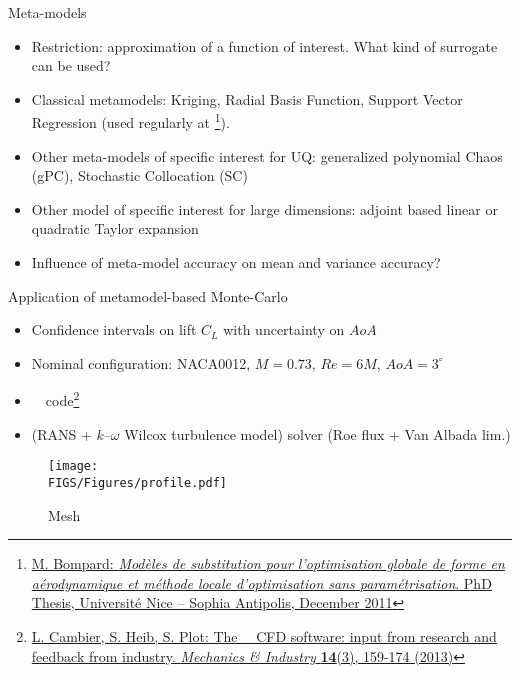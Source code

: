 \documentclass[10pt]{beamer}
\def\vt{\vspace{2mm}}
\def\vs{\vspace{7mm}}
\def\begit{\begin{itemize}}
\def\endit{\end{itemize}}
\newcommand{\lift}{C_L}
\begin{document}
\begin{frame}{Meta-models} 

\begit
\item Restriction: approximation of a function of interest. What kind of surrogate can be used?
\vs
\item[1] Classical metamodels: Kriging, Radial Basis Function, Support Vector Regression (used regularly at \Onera\footnote{\href{https://tel.archives-ouvertes.fr/tel-00771799}{{\scriptsize M. Bompard: {\sl Mod\`eles de substitution pour l'optimisation globale de forme en a\'erodynamique et m\'ethode locale d'optimisation sans param\'etrisation}. PhD Thesis, Universit\'e Nice -- Sophia Antipolis, December 2011}}}).
\vt
\item[2] Other meta-models of specific interest for UQ: generalized polynomial Chaos (gPC), Stochastic Collocation (SC)
\vt
\item[3] Other model of specific interest for large dimensions: adjoint based linear or quadratic Taylor expansion
\vs
\item Influence of meta-model accuracy on mean and variance accuracy?
\endit


\end{frame} 


\begin{frame}{Application of metamodel-based Monte-Carlo} 


\begit
\item Confidence intervals on lift $\lift$ with uncertainty on $AoA$
\item Nominal configuration: NACA0012, $M=0.73$, $Re=6M$, $AoA=3^{\circ}$
\item \Onera\ \elsA\ code\footnote{\href{\webDOI/10.1051/meca/2013056}{{\scriptsize L. Cambier, S. Heib, S. Plot: The \Onera\ \elsA\ CFD software: input from research and feedback from industry. {\sl Mechanics \& Industry} {\bf 14}(3), 159-174 (2013)}}} 
\item (RANS + $k$--$\omega$ Wilcox turbulence model) solver (Roe flux + Van Albada lim.)
\endit

\begin{figure}[!h]
\begin{center}
\texttt{[image: \\FIGS/Figures/profile.pdf]}
\caption{Mesh}
\end{center}
\end{figure}

%
\end{frame} 
%
\end{document}
